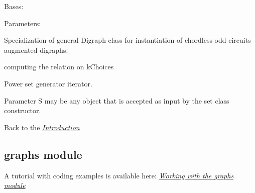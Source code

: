 \documentclass[letterpaper,10pt,english]{sphinxmanual}
\begin{document}

\begin{fulllineitems}
\label{techDoc:digraphs.kChoicesDigraph}
Bases: {\hyperref[techDoc:digraphs.Digraph]{}}
\begin{description}
\item[{Parameters:}] \leavevmode
{}

\end{description}

Specialization of general Digraph class for instantiation
of chordless odd circuits augmented digraphs.

\begin{fulllineitems}
\label{techDoc:digraphs.kChoicesDigraph.computeRelation}
computing the relation on kChoices

\end{fulllineitems}


\end{fulllineitems}


\begin{fulllineitems}
\label{techDoc:digraphs.powerset}
Power set generator iterator.

Parameter S may be any object that is accepted as input by the set class constructor.

\end{fulllineitems}


Back to the {\hyperref[techDoc:technical-label]{\emph{Introduction}}}


\subsection{graphs module}
\label{techDoc:graphs-label}\label{techDoc:graphs-module}
A tutorial with coding examples is available here: {\hyperref[tutorial:graphs-tutorial-label]{\emph{Working with the graphs module}}}
\label{techDoc:module-graphs}
\end{document}

